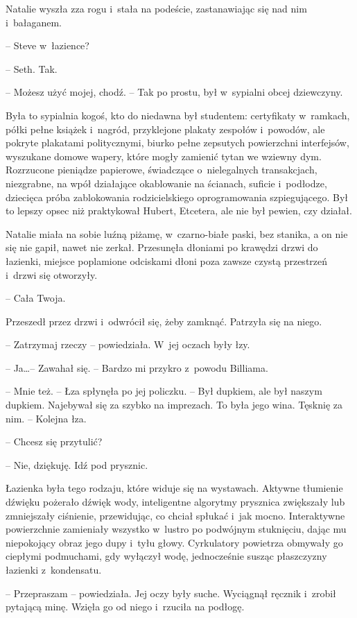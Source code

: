 \documentclass[oneside,polish,11pt,sfheadings]{mwbk}
\begin{document}
Natalie wyszła zza rogu i~stała na podeście, zastanawiając się nad nim i~bałaganem. 

-- Steve w~łazience?

-- Seth. Tak.

-- Możesz użyć mojej, chodź. -- Tak po prostu, był w~sypialni obcej
dziewczyny.

Była to sypialnia kogoś, kto do niedawna był studentem: certyfikaty w~ramkach, półki pełne książek i~nagród, przyklejone plakaty zespołów i~powodów, ale pokryte plakatami politycznymi, biurko pełne zepsutych
powierzchni interfejsów, wyszukane domowe wapery, które mogły zamienić
tytan we wziewny dym. Rozrzucone pieniądze papierowe, świadczące o~nielegalnych transakcjach, niezgrabne, na wpół działające okablowanie na
ścianach, suficie i~podłodze, dziecięca próba zablokowania
rodzicielskiego oprogramowania szpiegującego. Był to lepszy opsec niż
praktykował Hubert, Etcetera, ale nie był pewien, czy działał.

Natalie miała na sobie luźną piżamę, w~czarno-białe paski, bez stanika,
a on nie się nie gapił, nawet nie zerkał. Przesunęła dłoniami po
krawędzi drzwi do łazienki, miejsce poplamione odciskami dłoni poza
zawsze czystą przestrzeń i~drzwi się otworzyły. 

-- Cała Twoja.

Przeszedł przez drzwi i~odwrócił się, żeby zamknąć. Patrzyła się na
niego. 

-- Zatrzymaj rzeczy -- powiedziała. W~jej oczach były łzy.

-- Ja\ldots  -- Zawahał się. -- Bardzo mi przykro z~powodu Billiama.

-- Mnie też. -- Łza spłynęła po jej policzku. -- Był dupkiem, ale był
naszym dupkiem. Najebywał się za szybko na imprezach. To była jego wina.
Tęsknię za nim. -- Kolejna łza.

-- Chcesz się przytulić?

-- Nie, dziękuję. Idź pod prysznic.

Łazienka była tego rodzaju, które widuje się na wystawach. Aktywne
tłumienie dźwięku pożerało dźwięk wody, inteligentne algorytmy prysznica
zwiększały lub zmniejszały ciśnienie, przewidując, co chciał spłukać i~jak mocno. Interaktywne powierzchnie zamieniały wszystko w~lustro po
podwójnym stuknięciu, dając mu niepokojący obraz jego dupy i~tyłu głowy.
Cyrkulatory powietrza obmywały go ciepłymi podmuchami, gdy wyłączył
wodę, jednocześnie susząc płaszczyzny łazienki z~kondensatu.

-- Przepraszam -- powiedziała. Jej oczy były suche. Wyciągnął ręcznik i~zrobił pytającą minę. Wzięła go od niego i~rzuciła na podłogę.
\end{document}
